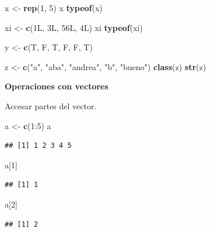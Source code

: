 \documentclass[]{article}
\newenvironment{Shaded}{\begin{snugshade}}{\end{snugshade}}
\newcommand{\KeywordTok}[1]{\textcolor[rgb]{0.13,0.29,0.53}{\textbf{{#1}}}}
\newcommand{\DecValTok}[1]{\textcolor[rgb]{0.00,0.00,0.81}{{#1}}}
\newcommand{\StringTok}[1]{\textcolor[rgb]{0.31,0.60,0.02}{{#1}}}
\newcommand{\NormalTok}[1]{{#1}}
\begin{document}
\begin{Shaded}
\begin{Highlighting}[]
\NormalTok{x <-}\StringTok{ }\KeywordTok{rep}\NormalTok{(}\DecValTok{1}\NormalTok{, }\DecValTok{5}\NormalTok{)}
\NormalTok{x}
\KeywordTok{typeof}\NormalTok{(x)}

\NormalTok{xi <-}\StringTok{ }\KeywordTok{c}\NormalTok{(1L, 3L, 56L, 4L)}
\NormalTok{xi}
\KeywordTok{typeof}\NormalTok{(xi)}

\NormalTok{y <-}\StringTok{ }\KeywordTok{c}\NormalTok{(T, F, T, F, F, T)}

\NormalTok{z <-}\StringTok{ }\KeywordTok{c}\NormalTok{(}\StringTok{"a"}\NormalTok{, }\StringTok{"aba"}\NormalTok{, }\StringTok{"andrea"}\NormalTok{, }\StringTok{"b"}\NormalTok{, }\StringTok{"bueno"}\NormalTok{)}
\KeywordTok{class}\NormalTok{(z)}
\KeywordTok{str}\NormalTok{(z)}
\end{Highlighting}
\end{Shaded}

\textbf{Operaciones con vectores}

Accesar partes del vector.

\begin{Shaded}
\begin{Highlighting}[]
\NormalTok{a <-}\StringTok{ }\KeywordTok{c}\NormalTok{(}\DecValTok{1}\NormalTok{:}\DecValTok{5}\NormalTok{)}
\NormalTok{a}
\end{Highlighting}
\end{Shaded}

\begin{verbatim}
## [1] 1 2 3 4 5
\end{verbatim}

\begin{Shaded}
\begin{Highlighting}[]
\NormalTok{a[}\DecValTok{1}\NormalTok{]}
\end{Highlighting}
\end{Shaded}

\begin{verbatim}
## [1] 1
\end{verbatim}

\begin{Shaded}
\begin{Highlighting}[]
\NormalTok{a[}\DecValTok{2}\NormalTok{]}
\end{Highlighting}
\end{Shaded}

\begin{verbatim}
## [1] 2
\end{verbatim}
\end{document}
